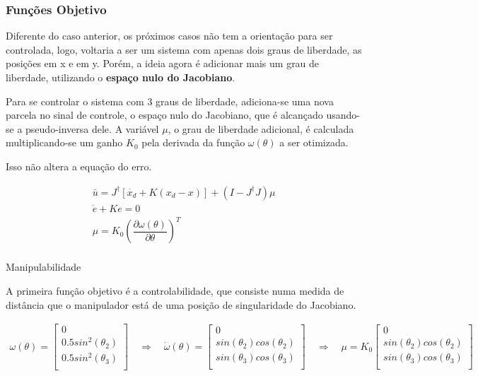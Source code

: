 \documentclass[a4paper,11pt]{article}
\theoremstyle{mytheor}
\begin{document}
\subsubsection{Funções Objetivo}

Diferente do caso anterior, os próximos casos não tem a orientação para ser controlada, logo, voltaria a ser um sistema com apenas dois graus de liberdade, as posições em x e em y. Porém, a ideia agora é adicionar mais um grau de liberdade, utilizando o \textbf{espaço nulo do Jacobiano}.

Para se controlar o sistema com 3 graus de liberdade, adiciona-se uma nova parcela no sinal de controle, o espaço nulo do Jacobiano, que é alcançado usando-se a pseudo-inversa dele. A variável $\mu$, o grau de liberdade adicional, é calculada multiplicando-se um ganho $K_0$ pela derivada da função $\omega(\theta)$ a ser otimizada.

Isso não altera a equação do erro.

\begin{gather*}
	\bar{u} = J^{\dagger}[\dot{x_d} + K(x_d - x)] + (I - J^{\dagger}J)\mu \\
	\dot{e} + Ke = 0 \\
	\mu = K_0\left( \dfrac{\partial \omega(\theta)}{\partial \theta} \right)^T  \\
\end{gather*}

\quad \textbullet \quad Manipulabilidade

A primeira função objetivo é a controlabilidade, que consiste numa medida de distância que o manipulador está de uma posição de singularidade do Jacobiano.

\begin{gather*}
	\omega(\theta) = 
	\begin{bmatrix} 
	0 \\
	0.5 sin^2(\theta_2) \\
	0.5 sin^2(\theta_3) \\
	\end{bmatrix} \quad \Rightarrow \quad 
	\dot{\omega}(\theta) = 
	\begin{bmatrix} 
	0 \\
	sin(\theta_2)cos(\theta_2) \\
	sin(\theta_3)cos(\theta_3) \\
	\end{bmatrix} \quad \Rightarrow \quad 
	\mu = K_0\begin{bmatrix} 
	0 \\
	sin(\theta_2)cos(\theta_2) \\
	sin(\theta_3)cos(\theta_3) \\
	\end{bmatrix}\\
\end{gather*}
\end{document}
